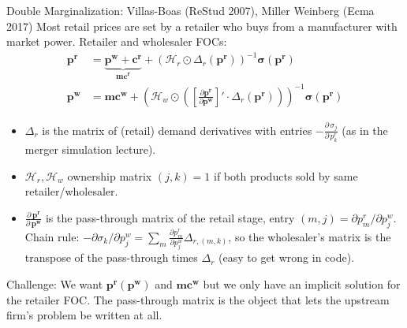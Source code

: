 \documentclass[aspectratio=169,10pt]{beamer}
\begin{document}
\begin{frame}{Double Marginalization: Villas-Boas (ReStud 2007), Miller Weinberg (Ecma 2017)}
\small
Most retail prices are set by a retailer who buys from a manufacturer with market power. Retailer and wholesaler FOCs:
\begin{align*}
\symbf{p^r} &= \underbrace{\symbf{p^w} +\symbf{c^r}}_{\symbf{mc^r}} +(\mathcal{H}_r \odot \Delta_{r}(\symbf{p^r}))^{-1} \symbf{\sigma}(\symbf{p^r})\\
\symbf{p^w}  &= \symbf{mc^w} + \left(\mathcal{H}_{w} \odot \left( \left[\frac{\partial \symbf{p^r}}{\partial \symbf{p^w}}\right]' \cdot  \Delta_r(\symbf{p^r} ) \right) \right)^{-1} \symbf{\sigma}(\symbf{p^r})
\end{align*}
\begin{itemize}
  \item $\Delta_r$ is the matrix of (retail) demand derivatives with entries $-\frac{\partial\, \sigma_j}{\partial\, p_k^r}$ (as in the merger simulation lecture).
\item $\mathcal{H}_r,\mathcal{H}_w$  ownership matrix $(j,k)=1$ if both products sold by same retailer/wholesaler.
\item $\frac{\partial\, \symbf{p^r}}{\partial\, \symbf{p^w}}$ is the \alert{pass-through matrix} of the retail stage, entry $(m,j) = \partial p^r_m / \partial p^w_j$. Chain rule: $-\partial \sigma_k/\partial p^w_j = \sum_m \frac{\partial p^r_m}{\partial p^w_j} \Delta_{r,(m,k)}$, so the wholesaler's matrix is the \alert{transpose} of the pass-through times $\Delta_r$ (easy to get wrong in code).
\end{itemize}
Challenge: We want $\symbf{p^r}(\symbf{p^w})$ and $\symbf{mc^w}$ but we only have an implicit solution for the retailer FOC. The pass-through matrix is the object that lets the upstream firm's problem be written at all.
\end{frame}
\end{document}
